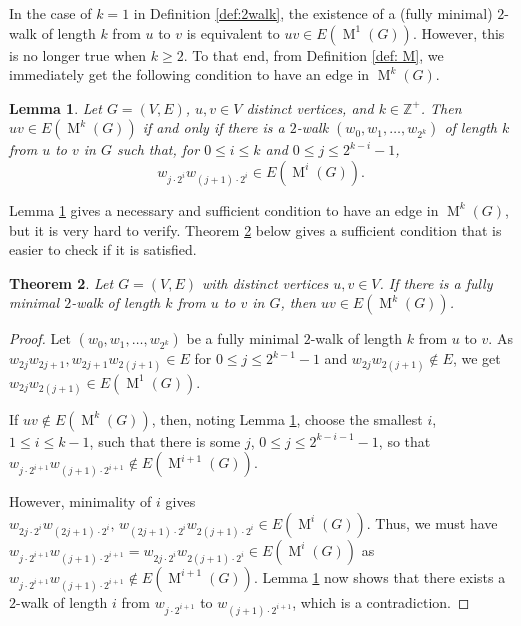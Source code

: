 \documentclass[12pt]{amsart}
\newtheorem{theorem}{Theorem}[section]
\newtheorem{lemma}[theorem]{Lemma}
\theoremstyle{definition}
\theoremstyle{remark}
\numberwithin{equation}{section}
\numberwithin{figure}{section}
\newcommand{\M}{\operatorname{M}}
\newcommand{\Z}{\mathbb{Z}}
\begin{document}
In the case of $k=1$ in Definition \ref{def:2walk}, the existence of a (fully minimal) $2$-walk of length $k$ from $u$ to $v$ is equivalent to $uv\in E(\M^1(G))$. However, this is no longer true when $k\geq 2$. To that end, from Definition \ref{def: M}, we immediately get the following condition to have an edge in $\M^k(G)$.
\begin{lemma} \label{lemma:edge in Mk implies walk}
    Let $G=(V,E)$, $u,v \in V$ distinct vertices, and $k\in \Z^+$. Then $uv \in E(\M^k(G))$ if and only if there is a $2$-walk $(w_0,w_1,\dots,w_{2^k})$ of length $k$ from $u$ to $v$ in $G$ such that, for $0 \leq i \leq k$ and $0 \leq j \leq 2^{k-i} - 1$, 
    \[ w_{j\cdot 2^i}w_{(j+1)\cdot2^i} \in E(\M^{i}(G)).\]
\end{lemma}

Lemma \ref{lemma:edge in Mk implies walk} gives a necessary and sufficient condition to have an edge in $\M^k(G)$, but it is very hard to verify. Theorem \ref{thm: rel min walk implies edge in Mk} below gives a sufficient condition that is easier to check if it is satisfied.
\begin{theorem} \label{thm: rel min walk implies edge in Mk}
    Let $G=(V,E)$ with distinct vertices $u,v \in V$. If there is a fully minimal $2$-walk of length $k$ from $u$ to $v$ in $G$, then $uv \in E(\M^k(G))$.
\end{theorem}

\begin{proof}
    Let $(w_0,w_1,\dots,w_{2^k})$ be a fully minimal $2$-walk of length $k$ from $u$ to $v$. As $w_{2j}w_{2j+1},w_{2j+1}w_{2(j+1)} \in E$ for $0 \leq j \leq 2^{k-1}-1$ and $w_{2j}w_{2(j+1)} \notin E$, we get $w_{2j}w_{2(j+1)} \in E(\M^1(G))$.

    If $uv\not\in E(\M^k(G))$, then, noting Lemma \ref{lemma:edge in Mk implies walk}, choose the smallest $i$, $1 \leq i \leq k-1$, such that there is some $j$, $0 \leq j \leq 2^{k-i-1} - 1$, 
    so that $w_{j\cdot 2^{i+1}}w_{(j+1)\cdot2^{i+1}} \notin E(\M^{i+1}(G))$. 
 
    However, minimality of $i$ gives
    $w_{2j\cdot 2^i}w_{(2j+1)\cdot2^i}, \, w_{(2j+1)\cdot2^i}w_{2(j+1)\cdot2^i} \in E(\M^i(G))$. Thus, we must have 
    $w_{j\cdot 2^{i+1}}w_{(j+1)\cdot2^{i+1}}=w_{2j\cdot 2^i} w_{2(j+1)\cdot2^i} \in E(\M^i(G))$ as $w_{j\cdot 2^{i+1}}w_{(j+1)\cdot2^{i+1}} \notin E(\M^{i+1}(G))$.   
    Lemma \ref{lemma:edge in Mk implies walk} now shows that there exists a $2$-walk of length $i$ from $w_{j\cdot 2^{i+1}}$ to $w_{(j+1)\cdot2^{i+1}}$, which is a contradiction.
\end{proof}
\end{document}
